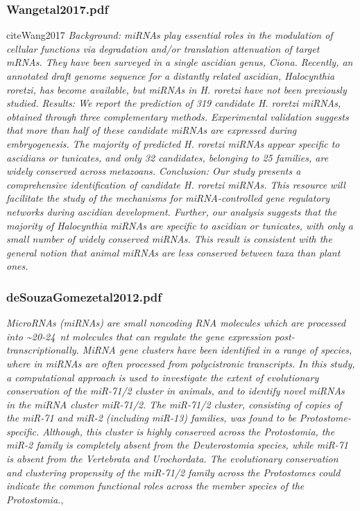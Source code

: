 \documentclass[graybox]{svmult}
\begin{document}
\subsubsection{Wangetal2017.pdf}
cite{Wang2017}
\textit{Background: miRNAs play essential roles in the modulation of cellular functions via degradation and/or translation
attenuation of target mRNAs. They have been surveyed in a single ascidian genus, Ciona. Recently, an annotated
draft genome sequence for a distantly related ascidian, Halocynthia roretzi, has become available, but miRNAs in
H. roretzi have not been previously studied.
Results: We report the prediction of 319 candidate H. roretzi miRNAs, obtained through three complementary
methods. Experimental validation suggests that more than half of these candidate miRNAs are expressed during
embryogenesis. The majority of predicted H. roretzi miRNAs appear specific to ascidians or tunicates, and only 32
candidates, belonging to 25 families, are widely conserved across metazoans.
Conclusion: Our study presents a comprehensive identification of candidate H. roretzi miRNAs. This resource
will facilitate the study of the mechanisms for miRNA-controlled gene regulatory networks during ascidian
development. Further, our analysis suggests that the majority of Halocynthia miRNAs are specific to ascidian
or tunicates, with only a small number of widely conserved miRNAs. This result is consistent with the general
notion that animal miRNAs are less conserved between taxa than plant ones.}

\subsubsection{deSouzaGomezetal2012.pdf}
\cite{DeSouzaGomes2013}
\textit{MicroRNAs (miRNAs) are small noncoding RNA molecules which are processed into {\~{}}20-24 nt molecules that can regulate the gene expression post-transcriptionally. MiRNA gene clusters have been identified in a range of species, where in miRNAs are often processed from polycistronic transcripts. In this study, a computational approach is used to investigate the extent of evolutionary conservation of the miR-71/2 cluster in animals, and to identify novel miRNAs in the miRNA cluster miR-71/2. The miR-71/2 cluster, consisting of copies of the miR-71 and miR-2 (including miR-13) families, was found to be Protostome-specific. Although, this cluster is highly conserved across the Protostomia, the miR-2 family is completely absent from the Deuterostomia species, while miR-71 is absent from the Vertebrata and Urochordata. The evolutionary conservation and clustering propensity of the miR-71/2 family across the Protostomes could indicate the common functional roles across the member species of the Protostomia.},
\end{document}
